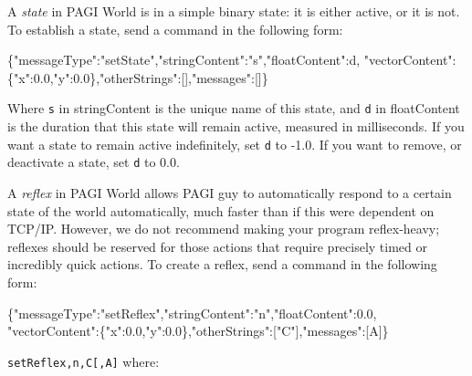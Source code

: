 A \textit{state} in PAGI World is in a simple binary state: it is either active, or it is not. To establish a state, send a command in the following form:
\begin{center}
	\scriptsize{\{"messageType":"setState","stringContent":"s","floatContent":d, "vectorContent":\{"x":0.0,"y":0.0\},"otherStrings":[],"messages":[]\}}
\end{center}
 Where \texttt{s} in stringContent is the unique name of this state, and \texttt{d} in floatContent is the duration that this state will remain active, measured in milliseconds. If you want a state to remain active indefinitely, set \texttt{d} to -1.0. If you want to remove, or deactivate a state, set \texttt{d} to 0.0.

A \textit{reflex} in PAGI World allows PAGI guy to automatically respond to a certain state of the world automatically, much faster than if this were dependent on TCP/IP. However, we do not recommend making your program reflex-heavy; reflexes should be reserved for those actions that require precisely timed or incredibly quick actions. To create a reflex, send a command in the following form:
\begin{center}
	\scriptsize{\{"messageType":"setReflex","stringContent":"n","floatContent":0.0, "vectorContent":\{"x":0.0,"y":0.0\},"otherStrings":["C"],"messages":[A]\}}
\end{center}
 \texttt{setReflex,n,C[,A]} where:

